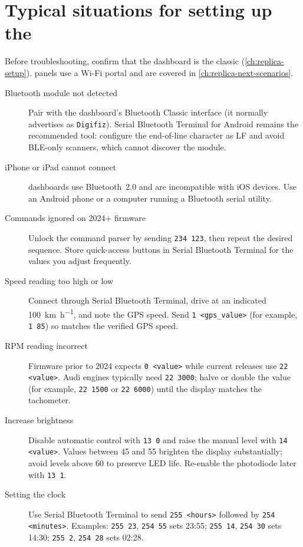 \chapter{Typical situations for setting up the \ReplicaGenOne{}}\label{ch:replica-scenarios}

Before troubleshooting, confirm that the dashboard is the classic \ReplicaGenOne{} (\autoref{ch:replica-setup}). \ReplicaNextLong{} panels use a Wi-Fi portal and are covered in \autoref{ch:replica-next-scenarios}.

\begin{description}
    \item[Bluetooth module not detected] Pair with the dashboard's Bluetooth Classic interface (it normally advertises as \texttt{Digifiz}). Serial Bluetooth Terminal for Android remains the recommended tool: configure the end-of-line character as LF and avoid BLE-only scanners, which cannot discover the module.
    \item[iPhone or iPad cannot connect] \ReplicaGenOneShort{} dashboards use Bluetooth~2.0 and are incompatible with iOS devices. Use an Android phone or a computer running a Bluetooth serial utility.
    \item[Commands ignored on 2024+ firmware] Unlock the command parser by sending \verb|234 123|, then repeat the desired sequence. Store quick-access buttons in Serial Bluetooth Terminal for the values you adjust frequently.
    \item[Speed reading too high or low] Connect through Serial Bluetooth Terminal, drive at an indicated \SI{100}{\kilo\metre\per\hour}, and note the GPS speed. Send \verb|1 <gps_value>| (for example, \verb|1 85|) so  matches the verified GPS speed.
    \item[RPM reading incorrect] Firmware prior to 2024 expects \verb|0 <value>| while current releases use \verb|22 <value>|. Audi engines typically need \verb|22 3000|; halve or double the value (for example, \verb|22 1500| or \verb|22 6000|) until the display matches the tachometer.
    \item[Increase brightness] Disable automatic control with \verb|13 0| and raise the manual level with \verb|14 <value>|. Values between 45 and 55 brighten the display substantially; avoid levels above 60 to preserve LED life. Re-enable the photodiode later with \verb|13 1|.
    \item[Setting the clock] Use Serial Bluetooth Terminal to send \verb|255 <hours>| followed by \verb|254 <minutes>|. Examples: \verb|255 23|, \verb|254 55| sets 23:55; \verb|255 14|, \verb|254 30| sets 14:30; \verb|255 2|, \verb|254 28| sets 02:28.

\end{description}
